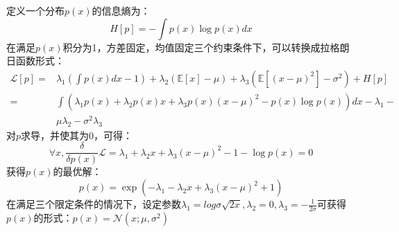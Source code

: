 定义一个分布$p(x)$的信息熵为：
\begin{equation}
    H[p]=-\int p(x)\log p(x)dx
\end{equation}
在满足$p(x)$积分为1，方差固定，均值固定三个约束条件下，可以转换成拉格朗日函数形式：
\begin{equation}
    \begin{aligned}
    \mathcal{L}[p]=&\lambda_1(\int p(x)dx-1)+\lambda_2(\mathbb{E}[x]-\mu)+\lambda_3(\mathbb{E}[(x-\mu)^2]-\sigma^2)+H[p]\\
    =&\int(\lambda_1p(x)+\lambda_2p(x)x+\lambda_3p(x)(x-\mu)^2-p(x)\log p(x))dx-\lambda_1-\\
    &\mu\lambda_2-\sigma^2\lambda_3
    \end{aligned}
\end{equation}
对$p$求导，并使其为0，可得：
\begin{equation}
    \forall x,\frac{\delta}{\delta p(x)}\mathcal{L}=\lambda_1+\lambda_2x+\lambda_3(x-\mu)^2-1-\log p(x)=0
\end{equation}
获得$p(x)$的最优解：
\begin{equation}
    p(x)=\exp (-\lambda_1-\lambda_2x+\lambda_3(x-\mu)^2+1)
\end{equation}
在满足三个限定条件的情况下，设定参数$\lambda_1=log \sigma\sqrt{2x}, \lambda_2=0, \lambda_3=-\frac{1}{2\sigma}$可获得$p(x)$的形式：$p(x)=\mathcal{N}(x;\mu,\sigma^2)$

